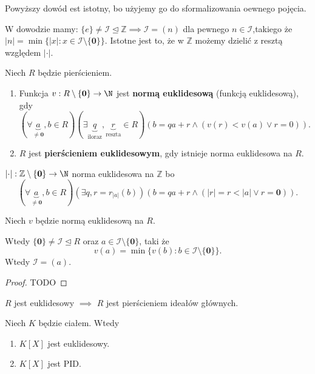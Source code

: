 Powyższy dowód est istotny, bo użyjemy go do sformalizowania oewnego pojęcia.

W dowodzie mamy: $\{e\} \neq \mathcal{I} \unlhd \mathbb{Z} \implies \mathcal{I}= \left( n \right) $ dla pewnego $n\in \mathcal{I}$,takiego że $\left| n \right| = \min \{\left| x \right| : x\in \mathcal{I}\setminus \{\mathbf{0}\} \} .$ Istotne jest to, że w $\mathbb{Z}$ możemy dzielić z resztą względem $\left| \cdot  \right| $.

\begin{definition}
	Niech $R$ będzie pierścieniem.
	\begin{enumerate}[label=\arabic*)]
		\item Funkcja $v: R\setminus \{\mathbf{0}\} \to \N $ jest  \textbf{normą euklidesową} (funkcją euklidesową), gdy
			\[
			\left(\forall \underbrace{a}_{\neq \mathbf{0}},b\in R \right)\left(\exists \underbrace{q}_{\text{iloraz}}, \underbrace{r}_{\text{reszta}}\in R \right)\left( b = qa +r \land \left( v\left( r \right) < v\left( a \right) \lor r = 0 \right) \right)   
			.\] 
		\item $R$ jest \textbf{pierścieniem euklidesowym}, gdy istnieje norma euklidesowa na $R$.
	\end{enumerate}
\end{definition} 
\begin{eg}
	$\left| \cdot  \right| : \mathbb{Z} \setminus \{\mathbf{0}\} \to \N$ norma euklidesowa na $\mathbb{Z} $ bo
	\[
	\left(\forall \underbrace{a}_{\neq \mathbf{0}},b\in R \right)\left(\exists q,r = r_{\scriptscriptstyle \left| a \right| }\left( b \right)  \right)\left( b = qa+r \land \left( \left| r \right| = r < \left| a \right| \lor r = \mathbf{0} \right)  \right)   
	.\] 
\end{eg} 
\begin{theorem}
	Niech $v$ będzie normą euklidesową na $R$.

	Wtedy $\{\mathbf{0}\} \neq \mathcal{I}\unlhd R$ oraz $a\in \mathcal{I}\setminus \{\mathbf{0}\} $, taki że
	\[
	v\left( a \right) = \min \{v\left( b \right) : b \in \mathcal{I}\setminus \{\mathbf{0}\} \} 
	.\] 
	Wtedy $\mathcal{I} = \left( a \right) $.
\end{theorem} 
\begin{proof}
	TODO
\end{proof} 
\begin{corollary}

	$R$ jest euklidesowy $\implies$ $R$ jest pierścieniem ideałów głównych.
\end{corollary}
\begin{theorem}
	Niech $ K$ będzie ciałem. Wtedy
	\begin{enumerate}[label=\arabic*)]
		\item $K\left[ X \right] $ jest euklidesowy.
		\item $K\left[ X \right] $ jest PID.
	\end{enumerate}
\end{theorem} 
